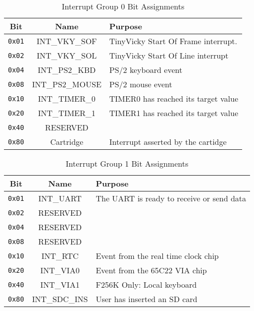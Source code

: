 \begin{table}[ht]
	\begin{center}
		\begin{tabular}{|c|c|l|} \hline
            Bit & Name & Purpose \\ \hline\hline
            \verb+0x01+ & INT\_VKY\_SOF & TinyVicky Start Of Frame interrupt. \\ \hline
            \verb+0x02+ & INT\_VKY\_SOL & TinyVicky Start Of Line interrupt \\ \hline
            \verb+0x04+ & INT\_PS2\_KBD & PS/2 keyboard event \\ \hline
            \verb+0x08+ & INT\_PS2\_MOUSE & PS/2 mouse event \\ \hline
            \verb+0x10+ & INT\_TIMER\_0 & TIMER0 has reached its target value \\ \hline
            \verb+0x20+ & INT\_TIMER\_1 & TIMER1 has reached its target value \\ \hline
            \verb+0x40+ & RESERVED & \\ \hline
            \verb+0x80+ & Cartridge & Interrupt asserted by the cartidge \\ \hline
        \end{tabular}
    \end{center}
	\caption{Interrupt Group 0 Bit Assignments}
	\label{tab:int_group_0}
\end{table}

\begin{table}[ht]
	\begin{center}
		\begin{tabular}{|c|c|l|} \hline
            Bit & Name & Purpose \\ \hline\hline
            \verb+0x01+ & INT\_UART & The UART is ready to receive or send data \\ \hline
            \verb+0x02+ & RESERVED & \\ \hline
            \verb+0x04+ & RESERVED & \\ \hline
            \verb+0x08+ & RESERVED & \\ \hline
            \verb+0x10+ & INT\_RTC & Event from the real time clock chip \\ \hline
            \verb+0x20+ & INT\_VIA0 & Event from the 65C22 VIA chip \\ \hline
            \verb+0x40+ & INT\_VIA1 & F256K Only: Local keyboard \\ \hline
            \verb+0x80+ & INT\_SDC\_INS & User has inserted an SD card \\ \hline
        \end{tabular}
    \end{center}
	\caption{Interrupt Group 1 Bit Assignments}
	\label{tab:int_group_1}
\end{table}

